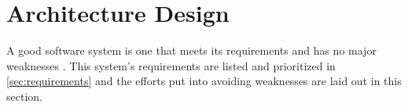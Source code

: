 \section{Architecture Design}
A good software system is one that meets its requirements and has no major weaknesses \citep[p.~179]{Rod-Aalborg}.
This system's requirements are listed and prioritized in \ref{sec:requirements} and the efforts put into avoiding weaknesses are laid out in this section.





